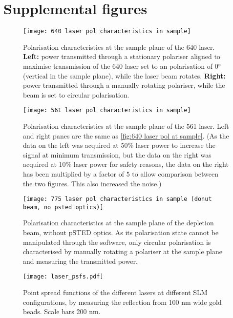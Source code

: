 \chapter{Supplemental figures}

\begin{figure}[ht]
	\centering
	\texttt{[image: 640 laser pol characteristics in sample]}
	\caption{
		Polarisation characteristics at the sample plane of the 640 laser. \textbf{Left:} power transmitted through a stationary polariser aligned to maximise transmission of the 640 laser set to an polarisation of 0° (vertical in the sample plane), while the laser beam rotates. \textbf{Right:} power transmitted through a manually rotating polariser, while the beam is set to circular polarisation.
	}
	\label{fig:640 laser pol at sample}
\end{figure}

\begin{figure}[ht]
	\centering
	\texttt{[image: 561 laser pol characteristics in sample]}
	\caption{
		Polarisation characteristics at the sample plane of the 561 laser. Left and right panes are the same as \autoref{fig:640 laser pol at sample}. (As the data on the left was acquired at 50\% laser power to increase the signal at minimum transmission, but the data on the right was acquired at 10\% laser power for safety reasons, the data on the right has been multiplied by a factor of 5 to allow comparison between the two figures. This also increased the noise.)
	}
	\label{fig:561 laser pol at sample}
\end{figure}

\begin{figure}[ht]
	\centering
	\texttt{[image: 775 laser pol characteristics in sample (donut beam, no psted optics)]}
	\caption{
		Polarisation characteristics at the sample plane of the depletion beam, without pSTED optics. As its polarisation state cannot be manipulated through the software, only circular polarisation is characterised by manually rotating a polariser at the sample plane and measuring the transmitted power.
	}
	\label{fig:775 laser pol at sample}
\end{figure}

\begin{figure}[ht]
	\centering
	\texttt{[image: laser\_psfs.pdf]}
	\caption{
		Point spread functions of the different lasers at different SLM configurations, by measuring the reflection from 100 nm wide gold beads. Scale bars 200 nm. 
	}
	\label{fig:normal psfs}
\end{figure}

